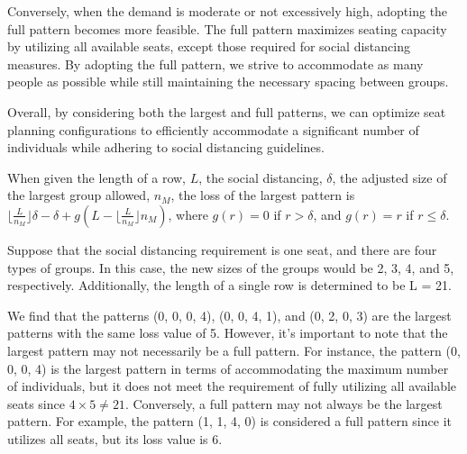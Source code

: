 Conversely, when the demand is moderate or not excessively high, adopting the full pattern becomes more feasible. The full pattern maximizes seating capacity by utilizing all available seats, except those required for social distancing measures. By adopting the full pattern, we strive to accommodate as many people as possible while still maintaining the necessary spacing between groups.

Overall, by considering both the largest and full patterns, we can optimize seat planning configurations to efficiently accommodate a significant number of individuals while adhering to social distancing guidelines.

\begin{lem}\label{lem_pattern}
  When given the length of a row, $L$, the social distancing, $\delta$, the adjusted size of the largest group allowed, $n_M$, the loss of the largest pattern is $\lfloor \frac{L}{n_M} \rfloor \delta - \delta + g(L - \lfloor \frac{L}{n_M} \rfloor n_M)$, where $g(r)=0$ if $r> \delta$, and $g(r)= r$ if $r \leq \delta$.
\end{lem}

\begin{example}
  Suppose that the social distancing requirement is one seat, and there are four types of groups. In this case, the new sizes of the groups would be 2, 3, 4, and 5, respectively. Additionally, the length of a single row is determined to be L = 21. 
  
  We find that the patterns (0, 0, 0, 4), (0, 0, 4, 1), and (0, 2, 0, 3) are the largest patterns with the same loss value of 5. However, it's important to note that the largest pattern may not necessarily be a full pattern. For instance, the pattern (0, 0, 0, 4) is the largest pattern in terms of accommodating the maximum number of individuals, but it does not meet the requirement of fully utilizing all available seats since $4 \times 5 \neq 21$. Conversely, a full pattern may not always be the largest pattern. For example, the pattern (1, 1, 4, 0) is considered a full pattern since it utilizes all seats, but its loss value is 6.
\end{example}



